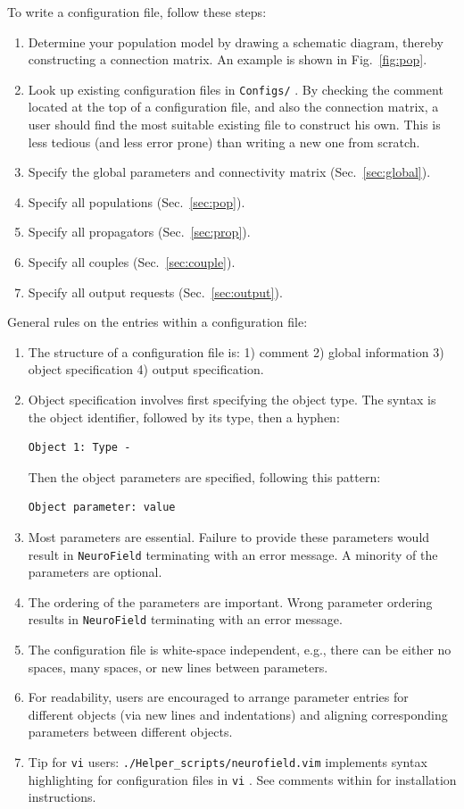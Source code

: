 \documentclass[12pt,a4paper]{article}
\newcommand{\type}[1]{ {\small\small\tt #1} }
\newcommand{\NF}[0]{ \type{NeuroField}}
\begin{document}
To write a configuration file, follow these steps:
\begin{enumerate}
\item Determine your population model by drawing a schematic diagram, thereby constructing a connection matrix. An example is shown in Fig.~\ref{fig:pop}.
\item Look up existing configuration files in \type{Configs/}. By checking the comment located at the top of a configuration file, and also the connection matrix, a user should find the most suitable existing file to construct his own. This is less tedious (and less error prone) than writing a new one from scratch.
\item Specify the global parameters and connectivity matrix (Sec.~\ref{sec:global}).
\item Specify all populations (Sec.~\ref{sec:pop}).
\item Specify all propagators (Sec.~\ref{sec:prop}).
\item Specify all couples (Sec.~\ref{sec:couple}).
\item Specify all output requests (Sec.~\ref{sec:output}).
\end{enumerate}

General rules on the entries within a configuration file:

\begin{enumerate}
	\item The structure of a configuration file is: 1) comment 2) global information 3) object specification 4) output specification.
	\item Object specification involves first specifying the object type. The syntax is the object identifier, followed by its type, then a hyphen:
		\begin{lstlisting}
Object 1: Type -
		\end{lstlisting}
		Then the object parameters are specified, following this pattern:
		\begin{lstlisting}
Object parameter: value
		\end{lstlisting}
	\item Most parameters are essential. Failure to provide these parameters would result in \NF terminating with an error message. A minority of the parameters are optional.
	\item The ordering of the parameters are important. Wrong parameter ordering results in \NF terminating with an error message.
	\item The configuration file is white-space independent, e.g., there can be either no spaces, many spaces, or new lines between parameters.
	\item For readability, users are encouraged to arrange parameter entries for different objects (via new lines and indentations) and aligning corresponding parameters between different objects.
	\item Tip for \type{vi} users: \type{./Helper\_scripts/neurofield.vim} implements syntax highlighting for configuration files in \type{vi}. See comments within for installation instructions.
\end{enumerate}
\end{document}
